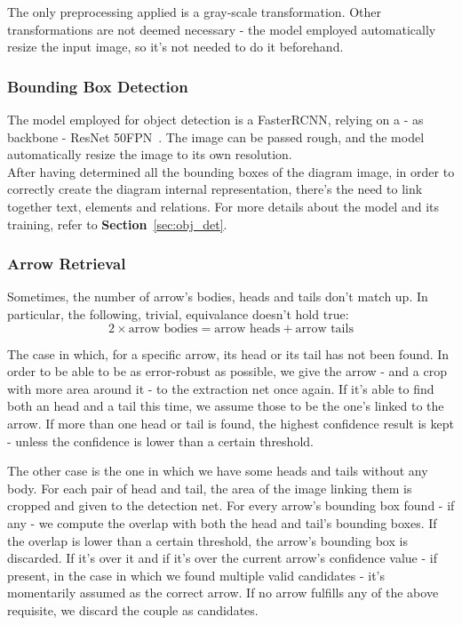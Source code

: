 \documentclass[conference]{IEEEtran}
\begin{document}
The only preprocessing applied is a gray-scale transformation. Other transformations are not deemed necessary - the model employed automatically resize the input image, so it's not needed to do it beforehand. \\

\subsubsection{Bounding Box Detection}
\label{extr:bbd}
The model employed for object detection is a FasterRCNN, relying on a - as backbone - ResNet 50FPN~\cite{rcnn}. The image can be passed rough, and the model automatically resize the image to its own resolution. \\ 
After having determined all the bounding boxes of the diagram image, in order to correctly create the diagram internal representation, there's the need to link together text, elements and relations. For more details about the model and its training, refer to \textbf{Section}~\ref{sec:obj_det}. \\

\subsubsection{Arrow Retrieval}
Sometimes, the number of arrow's bodies, heads and tails don't match up. In particular, the following, trivial, equivalance doesn't hold true:
$$
	2\times\text{arrow bodies} = \text{arrow heads} + \text{arrow tails}
$$

The case in which, for a specific arrow, its head or its tail has not been found. In order to be able to be as error-robust as possible, we give the arrow - and a crop with more area around it - to the extraction net once again. If it's able to find both an head and a tail this time, we assume those to be the one's linked to the arrow. If more than one head or tail is found, the highest confidence result is kept - unless the confidence is lower than a certain threshold. 

The other case is the one in which we have some heads and tails without any body. For each pair of head and tail, the area of the image linking them is cropped and given to the detection net. For every arrow's bounding box found - if any - we compute the overlap with both the head and tail's bounding boxes. If the overlap is lower than a certain threshold, the arrow's bounding box is discarded. If it's over it and if it's over the current arrow's confidence value - if present, in the case in which we found multiple valid candidates - it's momentarily assumed as the correct arrow. If no arrow fulfills any of the above requisite, we discard the couple as candidates. \\
\end{document}
